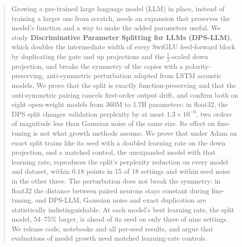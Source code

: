 \providecommand{\figwidth}{\columnwidth}          %
\providecommand{\appref}[1]{Appendix~\ref{#1}}   %
\providecommand{\ethicsheading}{Ethics Statement} %

\begin{abstract}
Growing a pre-trained large language model (LLM) in place, instead of training a larger one from scratch, needs an expansion that preserves the model's function and a way to make the added parameters useful.
We study \textbf{Discriminative Parameter Splitting for LLMs (DPS-LLM)}, which doubles the intermediate width of every SwiGLU feed-forward block by duplicating the gate and up projections and the $\tfrac{1}{2}$-scaled down projection, and breaks the symmetry of the copies with a polarity-preserving, anti-symmetric perturbation adapted from LSTM acoustic models.
We prove that the split is exactly function-preserving and that the anti-symmetric pairing cancels first-order output drift, and confirm both on eight open-weight models from 360M to 1.7B parameters: in float32, the DPS split changes validation perplexity by at most $1.3\times10^{-6}$, two orders of magnitude less than Gaussian noise of the same size.
Its effect on fine-tuning is not what growth methods assume. We prove that under Adam an exact split trains like its seed with a doubled learning rate on the down projection, and a matched control, the unexpanded model with that learning rate, reproduces the split's perplexity reduction on every model and dataset, within $0.18$ points in 15 of 18 settings and within seed noise in the other three.
The perturbation does not break the symmetry: in float32 the distance between paired neurons stays constant during fine-tuning, and DPS-LLM, Gaussian noise and exact duplication are statistically indistinguishable. At each model's best learning rate, the split model, 54--75\% larger, is ahead of its seed on only three of nine settings.
We release code, notebooks and all per-seed results, and argue that evaluations of model growth need matched learning-rate controls.
\end{abstract}

